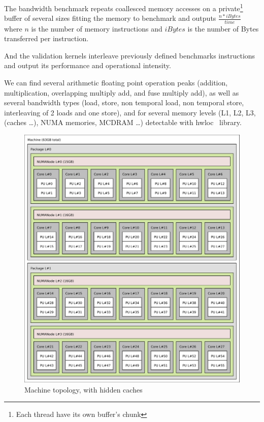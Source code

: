 \documentclass[twoside,twocolumn,8pt]{extarticle}
\begin{document}
The bandwidth benchmark repeats coallesced memory accesses on a private\footnote{Each thread have its own buffer's chunk} buffer of several sizes fitting the memory to benchmark and outputs $\frac{n*iBytes}{time}$ where $n$ is the number of memory instructions and $iBytes$ is the number of Bytes transferred per instruction.

And the validation kernels interleave previously defined benchmarks instructions and output its performance and operational intensity.

We can find several arithmetic floating point operation peaks (addition, multiplication, overlapping multiply add, and fuse
multiply add), as well as several bandwidth types (load, store, non temporal load, non temporal store, interleaving of 2 loads and one store), and for several memory levels (L1, L2, L3, (caches \dots), NUMA memories, MCDRAM \dots) detectable with hwloc~\cite{6903671} library.

\begin{figure}
  \centering
  \includegraphics[width=.5\textwidth]{pictures/Xeon_E5_2650L_v4}
  \caption{Machine topology, with hidden caches}
  \label{fig:joe0}
\end{figure}
\end{document}
